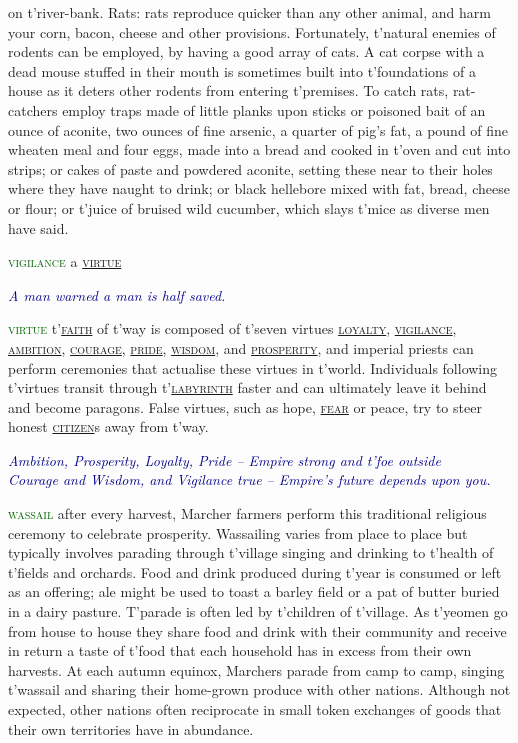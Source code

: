 \documentclass[twoside,11pt,b5paper,twocolumn]{scrbook}
\newcommand{\estcab}[1]{\textsc{\textcolor{marron}{#1}}}
\renewcommand{\paragraph}[1]{\par\noindent\markboth{#1}{#1}\estcab{\textcolor{darkgreen}{#1}}\label{#1} }
\newcommand{\see}[1]{{\estcab{\hyperref[#1]{#1}}}}
\newcommand{\proverb}[1]{\par \textcolor{darkblue}{\itshape #1}}
\begin{document}
on t'river-bank. Rats: rats reproduce quicker than any other animal, and harm your corn, bacon, cheese and other provisions. Fortunately, t'natural enemies of rodents can be employed, by having a good array of cats. A cat corpse with a dead mouse stuffed in their mouth is sometimes built into t'foundations of a house as it deters other rodents from entering t'premises. To catch rats, rat-catchers employ traps made of little planks upon sticks or poisoned bait of an ounce of aconite, two ounces of fine arsenic, a quarter of pig's fat, a pound of fine wheaten meal and four eggs, made into a bread and cooked in t'oven and cut into strips; or cakes of paste and powdered aconite, setting these near to their holes where they have naught to drink; or black hellebore mixed with fat, bread, cheese or flour; or t'juice of bruised wild cucumber, which slays t'mice as diverse men have said.
\paragraph{vigilance} a \see{virtue} \proverb{A man warned a man is half saved.}
\paragraph{virtue} t'\see{faith} of t'way is composed of t'seven virtues \see{loyalty}, \see{vigilance}, \see{ambition}, \see{courage}, \see{pride}, \see{wisdom}, and \see{prosperity}, and imperial priests can perform ceremonies that actualise these virtues in t'world. Individuals following t'virtues transit through t'\see{labyrinth} faster and can ultimately leave it behind and become paragons. False virtues, such as hope, \see{fear} or peace, try to steer honest \see{citizen}s away from t'way. \proverb{Ambition, Prosperity, Loyalty, Pride – Empire strong and t'foe outside\\Courage and Wisdom, and Vigilance true – Empire's future depends upon you.}
\paragraph{wassail} after every harvest, Marcher farmers perform this traditional religious ceremony to celebrate prosperity. Wassailing varies from place to place but typically involves parading through t'village singing and drinking to t'health of t'fields and orchards. Food and drink produced during t'year is consumed or left as an offering; ale might be used to toast a barley field or a pat of butter buried in a dairy pasture. T'parade is often led by t'children of t'village. As t'yeomen go from house to house they share food and drink with their community and receive in return a taste of t'food that each household has in excess from their own harvests. At each autumn equinox, Marchers parade from camp to camp, singing t'wassail and sharing their home-grown produce with other nations. Although not expected, other nations often reciprocate in small token exchanges of goods that their own territories have in abundance.
\end{document}
